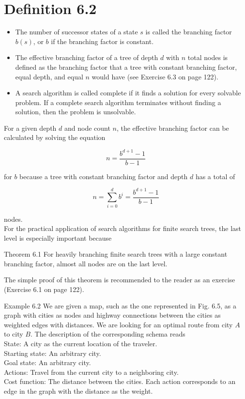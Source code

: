 \documentclass[10pt]{book}
\begin{document}
\section*{Definition 6.2}
\begin{itemize}
  \item The number of successor states of a state $s$ is called the branching factor $b(s)$, or $b$ if the branching factor is constant.
  \item The effective branching factor of a tree of depth $d$ with $n$ total nodes is defined as the branching factor that a tree with constant branching factor, equal depth, and equal $n$ would have (see Exercise 6.3 on page 122).
  \item A search algorithm is called complete if it finds a solution for every solvable problem. If a complete search algorithm terminates without finding a solution, then the problem is unsolvable.
\end{itemize}

For a given depth $d$ and node count $n$, the effective branching factor can be calculated by solving the equation


\begin{equation*}
n=\frac{b^{d+1}-1}{b-1} \tag{6.1}
\end{equation*}



for $b$ because a tree with constant branching factor and depth $d$ has a total of


\begin{equation*}
n=\sum_{i=0}^{d} b^{i}=\frac{b^{d+1}-1}{b-1} \tag{6.2}
\end{equation*}


nodes.\\
For the practical application of search algorithms for finite search trees, the last level is especially important because

Theorem 6.1 For heavily branching finite search trees with a large constant branching factor, almost all nodes are on the last level.

The simple proof of this theorem is recommended to the reader as an exercise (Exercise 6.1 on page 122).

Example 6.2 We are given a map, such as the one represented in Fig. 6.5, as a graph with cities as nodes and highway connections between the cities as weighted edges with distances. We are looking for an optimal route from city $A$ to city $B$. The description of the corresponding schema reads\\
State: A city as the current location of the traveler.\\
Starting state: An arbitrary city.\\
Goal state: An arbitrary city.\\
Actions: Travel from the current city to a neighboring city.\\
Cost function: The distance between the cities. Each action corresponds to an edge in the graph with the distance as the weight.
\end{document}
